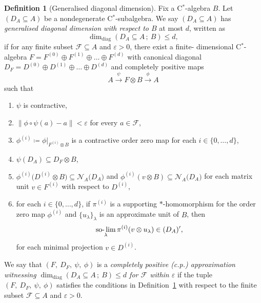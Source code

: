 \documentclass[a4paper]{amsart}
\newcommand{\myhyp}{\textnormal{-}\hskip0pt\relax}
\numberwithin{equation}{section}
\newcommand{\Fcal}{\mathcal{F}}
\newcommand{\e}{\varepsilon}
\newcommand{\cstar}{C$^\ast$\myhyp{}algebra}
\newcommand{\cstarSub}{C$^\ast$\myhyp{}subalgebra}
\newcommand{\prn}[1]{{(#1)}}
\DeclareMathOperator{\solim}{\mathrm{so\myhyp{}}\lim}
\newcommand{\normreg}[1]{{\lVert #1  \rVert}}
\newcommand{\normalisers}[2]{{\mathcal{N}}_{#2}{\big({#1}\big)}}
\newcommand{\ddimn}[3]{\dim_{\mathrm{diag}}({#1}\subseteq{#2}\, ;~{#3})}
\theoremstyle{plain}
\theoremstyle{indented}
\numberwithin{equation}{section}
\theoremstyle{definition}
\newtheorem{defin}[thm]{Definition}
\theoremstyle{remark}
\theoremstyle{plain}
\theoremstyle{definition}
\begin{document}
\newpage
\begin{defin}[Generalised diagonal dimension] \label{def:genDiagDim}
    Fix a \cstar{} $B$. 
    Let \linebreak
    ${(D_A\subseteq{A})}$ be a nondegenerate \cstarSub{}. 
    We say ${(D_A \subseteq A)}$ has \emph{generalised diagonal dimension with respect to $B$} at most $d$, written as
    \[\ddimn{D_A}{A}{B} \le d,\]
    if for any finite subset 
    ${\Fcal \subseteq {A}}$ and ${\e > 0}$, there exist a finite\myhyp{}
    \linebreak 
    dimensional
    \cstar{} 
    ${F=F^{(0)}\oplus F^{(1)} \oplus \hdots \oplus F^{(d)}}$ 
    with canonical diagonal \linebreak
    ${D_F = D^{(0)} \oplus D^{(1)} \oplus \hdots \oplus D^{(d)}}$ 
    and completely positive maps 
    \[ {A \overset{\psi}{\longrightarrow} F \otimes B \overset{\phi}{\longrightarrow} A}\]
    such that
    {
    \begin{enumerate} \renewcommand{\labelenumi}{(\arabic{enumi})}
        \item $\psi$ is contractive,
        \item ${\normreg{\phi \circ \psi(a) - a } < \e }$ for every $a \in \Fcal$,
        \item ${\phi^{(i)} \coloneq \phi|_{F^{(i)} \otimes B}}$ is a contractive order zero map for each ${i \in \{0,\hdots,d\}}$,
        \item ${\psi(D_A) \subseteq D_F \otimes B}$,
        
        
        \item ${\phi^{(i)} \big( {D^{(i)} \otimes B} \big) \subseteq \normalisers{D_A}{A}}$
        and
        ${\phi^{(i)} ( v \otimes B )  \subseteq \normalisers{D_A}{A}}$
        for each matrix unit ${v \in F^\prn{i}}$ with respect to ${D^{\prn{i}}}$,
        
        \item for each ${i\in \{0,\hdots, d\}}$, if
        $\pi^{(i)}$ is a supporting ${\ast}$\myhyp{}homomorphism for the order zero map $\phi^{(i)}$ and ${\{u_\lambda\}_\lambda}$ is an approximate unit of $B$, then
        \[{\solim_\lambda \pi^{(i)}(v \otimes u_\lambda) \in (D_A)'},\]
        for each minimal projection ${v \in D^{\prn{i}}}$.
    \end{enumerate}
    }
\end{defin}

We say that ${(F,~D_F,~\psi,~\phi)}$ is a \emph{completely positive (c.p.) approximation witnessing 
${\ddimn{D_A}{A}{B} \le d}$ for $\Fcal$ within $\e$} if the tuple ${(F,~D_F,~\psi,~\phi)}$ satisfies the conditions in Definition~\ref{def:genDiagDim} with respect to the finite subset ${\Fcal \subseteq A}$ and ${\e>0}$. 
\end{document}
